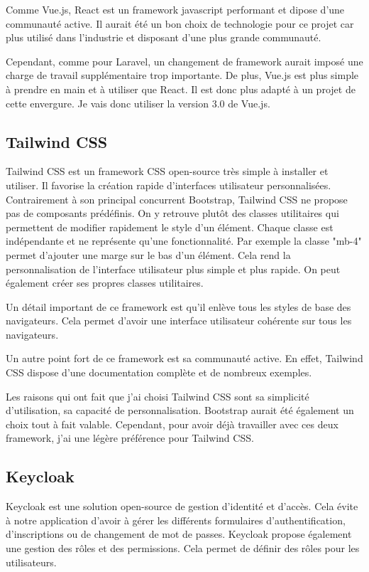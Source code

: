 Comme Vue.js, React est un framework javascript performant et dipose d'une communauté active. Il aurait été un bon choix de technologie pour ce projet car plus utilisé dans l'industrie et disposant d'une plus grande communauté.

Cependant, comme pour Laravel, un changement de framework aurait imposé une charge de travail supplémentaire trop importante. De plus, Vue.js est plus simple à prendre en main et à utiliser que React. Il est donc plus adapté à un projet de cette envergure. Je vais donc utiliser la version 3.0 de Vue.js.

\subsection{Tailwind CSS}
Tailwind CSS \cite{TailwindCSS} est un framework CSS open-source très simple à installer et utiliser. Il favorise la création rapide d'interfaces utilisateur personnalisées. Contrairement à son principal concurrent Bootstrap, Tailwind CSS ne propose pas de composants prédéfinis. On y retrouve plutôt des classes utilitaires qui permettent de modifier rapidement le style d'un élément. Chaque classe est indépendante et ne représente qu'une fonctionnalité. Par exemple la classe "mb-4" permet d'ajouter une marge sur le bas d'un élément. Cela rend la personnalisation de l'interface utilisateur plus simple et plus rapide. On peut également créer ses propres classes utilitaires.

Un détail important de ce framework est qu'il enlève tous les styles de base des navigateurs. Cela permet d'avoir une interface utilisateur cohérente sur tous les navigateurs.

Un autre point fort de ce framework est sa communauté active. En effet, Tailwind CSS dispose d'une documentation complète et de nombreux exemples.

Les raisons qui ont fait que j'ai choisi Tailwind CSS sont sa simplicité d'utilisation, sa capacité de personnalisation. Bootstrap aurait été également un choix tout à fait valable. Cependant, pour avoir déjà travailler avec ces deux framework, j'ai une légère préférence pour Tailwind CSS.

\subsection{Keycloak}
Keycloak \cite{Keycloak} est une solution open-source de gestion d'identité et d'accès. Cela évite à notre application d'avoir à gérer les différents formulaires d'authentification, d'inscriptions ou de changement de mot de passes. Keycloak propose également une gestion des rôles et des permissions. Cela permet de définir des rôles pour les utilisateurs.

